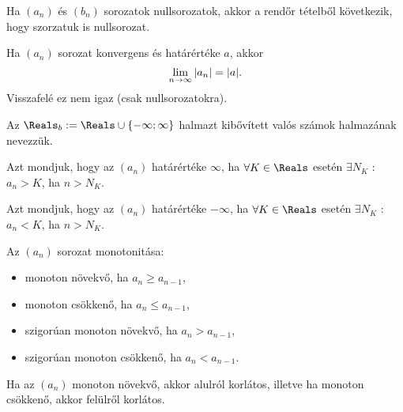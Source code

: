\begin{note}
  Ha $(a_n)$ és $(b_n)$ sorozatok nullsorozatok, akkor a rendőr tételből
  következik, hogy szorzatuk is nullsorozat.
\end{note}

\begin{note}
  Ha $(a_n)$ sorozat konvergens és határértéke $a$, akkor
  \[
    \lim\limits_{n \rightarrow \infty} |a_n|=|a|
    \text.
  \]
  Visszafelé ez nem igaz (csak nullsorozatokra).
\end{note}

\begin{definition}
  Az $\Reals_b := \Reals \cup \{-\infty; \infty\}$ halmazt kibővített valós
  számok halmazának nevezzük.
\end{definition}


\begin{definition}
  Azt mondjuk, hogy az $(a_n)$ határértéke $\infty$, ha $\forall K \in \Reals$
  esetén $\exists N_K$ : $a_n > K$, ha $n > N_K$.

  Azt mondjuk, hogy az $(a_n)$ határértéke $-\infty$, ha $\forall K \in \Reals$
  esetén $\exists N_K$ : $a_n < K$, ha $n > N_K$.
\end{definition}


\begin{definition}
  Az $(a_n)$ sorozat monotonitása:
  \begin{itemize}
    \item monoton növekvő, ha $a_n \geq a_{n-1}$,
    \item monoton csökkenő, ha $a_n \leq a_{n-1}$,
    \item szigorúan monoton növekvő, ha $a_n > a_{n-1}$,
    \item szigorúan monoton csökkenő, ha $a_n < a_{n-1}$.
  \end{itemize}
\end{definition}

\begin{note}
  Ha az $(a_n)$ monoton növekvő, akkor alulról korlátos, illetve ha monoton
  csökkenő, akkor felülről korlátos.
\end{note}

